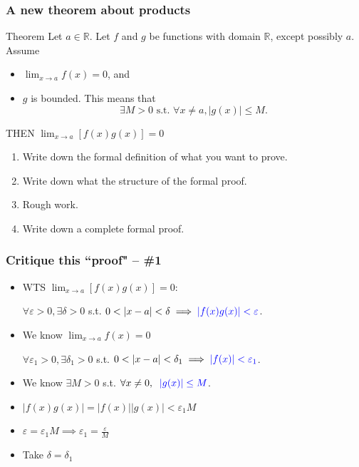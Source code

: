 \documentclass[14pt]{beamer}
\begin{document}
\begin{frame}[t]
	\frametitle{A new theorem about products}
	\fontsize{13}{13}\selectfont
	\begin{block}{Theorem}
		Let $a \in \mathbb{R}$. Let $f$ and $g$ be functions with domain
		$\mathbb{R}$, except possibly $a$. Assume
		\begin{itemize}
			\item $\displaystyle \lim_{x \to a}f(x) = 0$, and

			\item $g$ is bounded. This means that
				\[
					\exists M >0 \text{ s.t. }\forall x \neq a, |g(x)| \leq M.
				\]
		\end{itemize}
		THEN $\displaystyle \lim_{x \to a}\left[ f(x) g(x) \right] = 0$
	\end{block}

	\vfill
	\begin{enumerate}

		\item Write down the formal definition of what you want to prove.

		\item Write down what the structure of the formal proof.

		\item Rough work.

		\item Write down a complete formal proof.
	\end{enumerate}
	\vfill
\end{frame}

\begin{frame}[t]
	\frametitle{Critique this ``proof" -- \#1}
	\fontsize{13}{13}\selectfont
	\begin{itemize}
		\item WTS $\displaystyle \lim_{x \to a}\left[ f(x) g(x) \right] = 0$:

			\hfill $\displaystyle \forall \varepsilon>0, \exists \delta>0$ \; s.t. \;
			$\displaystyle 0<|x-a|<\delta \implies{\color{blue} |f(x) g(x)| < \varepsilon}$.
			\vfill

		\item We know $\displaystyle \lim_{x \to a}f(x) = 0$

			\hfill $\displaystyle \forall \varepsilon_{1}>0, \exists \delta_{1}>0$ \;
			s.t. \; $\displaystyle 0<|x-a|<\delta_{1}\implies{\color{blue} |f(x)| <\varepsilon_1}$.
			\vfill

		\item We know \hfill $\displaystyle \exists M>0$ \; s.t. \;
			$\displaystyle \forall x \neq 0, \; \;{\color{blue} |g(x)| \leq M}$.
			\vfill

		\item $\displaystyle |f(x)g(x)| = |f(x)||g(x)| < \varepsilon_{1}M$
			\vfill

		\item $\displaystyle \varepsilon = \varepsilon_{1}M \implies \varepsilon_{1}=
			\frac{\varepsilon}{M}$
			\vfill

		\item Take $\displaystyle \delta = \delta_{1}$
			\vfill
	\end{itemize}
\end{frame}
\end{document}

